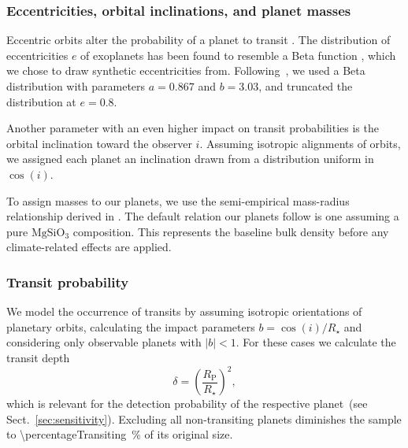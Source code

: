 \documentclass[twocolumn]{aastex631}
\begin{document}
\subsubsection{Eccentricities, orbital inclinations, and planet masses}
Eccentric orbits alter the probability of a planet to transit \citep[e.g.,][]{Barnes2007a}.
The distribution of eccentricities $e$ of exoplanets has been found to resemble a Beta function \citep{Kipping2013b}, which we chose to draw synthetic eccentricities from.
Following~\citet{Kipping2013b}, we used a Beta distribution with parameters $a=0.867$ and $b=3.03$, and truncated the distribution at $e = 0.8$.

Another parameter with an even higher impact on transit probabilities is the orbital inclination toward the observer $i$.
Assuming isotropic alignments of orbits, we assigned each planet an inclination drawn from a distribution uniform in $\cos(i)$.

To assign masses to our planets, we use the semi-empirical mass-radius relationship derived in \citet{Zeng2016}.
The default relation our planets follow is one assuming a pure $\mathrm{MgSiO_3}$ composition.
This represents the baseline bulk density before any climate-related effects are applied.


\subsubsection{Transit probability}
\begin{note}
    We model the occurrence of transits by assuming isotropic orientations of planetary orbits, calculating the impact parameters $b = \cos(i)/R_\star$ and considering only observable planets with $|b| < 1$.
    For these cases we calculate the transit depth
    \begin{equation}\label{eq:transitdepth}
        \delta = \left( \frac{R_\mathrm{P}}{R_\star} \right)^2,
    \end{equation}
    which is relevant for the detection probability of the respective planet~(see Sect.~\ref{sec:sensitivity}).
    Excluding all non-transiting planets diminishes the sample to \SI{\percentageTransiting}{\percent} of its original size.
\end{note}
\end{document}
